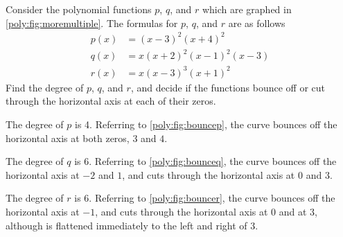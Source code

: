 \begin{pccexample}
	Consider the polynomial functions $p$, $q$, and $r$ which are 
	graphed in \cref{poly:fig:moremultiple}. 
	The formulas for $p$, $q$, and $r$ are as follows
	\begin{align*}
		p(x) & =(x-3)^2(x+4)^2       \\       
		q(x) & =x(x+2)^2(x-1)^2(x-3) \\ 
		r(x) & =x(x-3)^3(x+1)^2      
	\end{align*}
	Find the degree of $p$, $q$, and $r$, and decide if the functions bounce off or cut 
	through the horizontal axis at each of their zeros.
	\begin{pccsolution}
		The degree of $p$ is 4. Referring to \cref{poly:fig:bouncep}, 
		the curve bounces off the horizontal axis at both zeros, $3$ and $4$.
		
		The degree of $q$ is 6. Referring to \cref{poly:fig:bounceq},
		the curve bounces off the horizontal axis at $-2$ and $1$, and cuts 
		through the horizontal axis at $0$ and $3$.
		
		The degree of $r$ is 6. Referring to \cref{poly:fig:bouncer},
		the curve bounces off the horizontal axis at $-1$, and cuts through 
		the horizontal axis at $0$ and at $3$, although is flattened immediately to the left and right of $3$.
	\end{pccsolution}
\end{pccexample}

